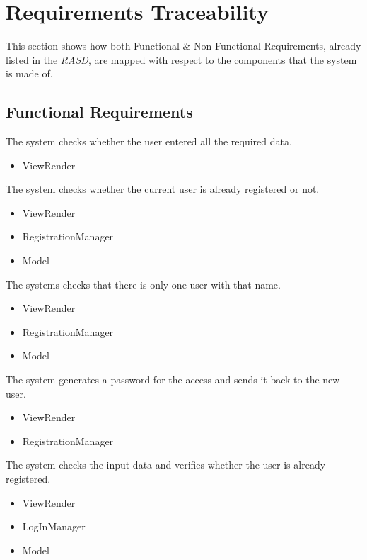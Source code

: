 \documentclass[11pt,a4paper]{report}
\begin{document}
\chapter{Requirements Traceability}
This section shows how both Functional \& Non-Functional Requirements, already listed in the \textit{RASD}, are mapped with respect to the components that the system is made of.
\section{Functional Requirements}
	\begin{Req}
		\item The system checks whether the user entered all the required data.
			\begin{itemize}
				\item ViewRender
			\end{itemize}
		\item The system checks whether the current user is already registered or not.
			\begin{itemize}
				\item ViewRender
				\item RegistrationManager
				\item Model
			\end{itemize}
		\item The systems checks that there is only one user with that name.
			\begin{itemize}
				\item ViewRender
				\item RegistrationManager
				\item Model
			\end{itemize}
		\item The system generates a password for the access and sends it back to the new user.
			\begin{itemize}
				\item ViewRender
				\item RegistrationManager
			\end{itemize}
		\item The system checks the input data and verifies whether the user is already registered.
			\begin{itemize}
				\item ViewRender
				\item LogInManager
				\item Model

\end{itemize}
\end{Req}
\end{document}
